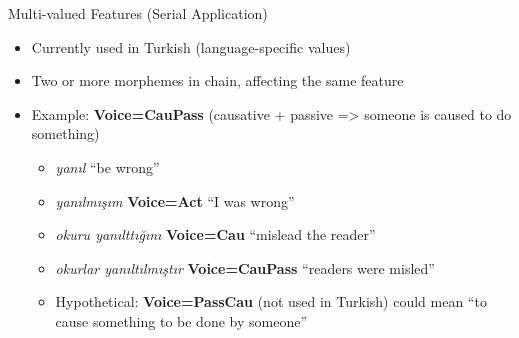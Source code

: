 \documentclass[10pt, compress, aspectratio=169]{beamer}
\newcommand{\feat}[1]{\textbf{\footnotesize\color{red}#1}}
\begin{document}
\begin{frame}{Multi-valued Features (Serial Application)}
\begin{itemize}
\item Currently used in Turkish (language-specific values)
\bigskip
\item Two or more morphemes in chain, affecting the same feature
\bigskip
\item Example: \feat{Voice=CauPass} (causative + passive => someone is caused to do something)
  \begin{itemize}
  \item \textit{yanıl} ``be wrong''
  \item \textit{yanılmışım} \feat{Voice=Act} ``I was wrong''
  \item \textit{okuru yanılttığını} \feat{Voice=Cau} ``mislead the reader''
  \item \textit{okurlar yanıltılmıştır} \feat{Voice=CauPass} ``readers were misled''
  \item<2-> Hypothetical: \feat{Voice=PassCau} (not used in Turkish) could mean ``to cause something to be done by someone''
  \end{itemize}
\end{itemize}
\end{frame}
\end{document}
